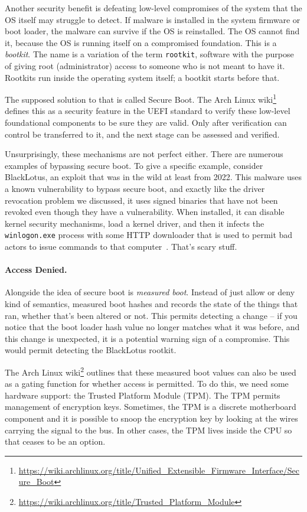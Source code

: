 Another security benefit is defeating low-level compromises of the system that the OS itself may struggle to detect. If malware is installed in the system firmware or boot loader, the malware can survive if the OS is reinstalled. The OS cannot find it, because the OS is running itself on a compromised foundation. This is a \textit{bootkit}. The name is a variation of the term \texttt{rootkit}, software with the purpose of giving root (administrator) access to someone who is not meant to have it. Rootkits run inside the operating system itself; a bootkit starts before that. 

The supposed solution to that is called Secure Boot. The Arch Linux wiki\footnote{ \url{https://wiki.archlinux.org/title/Unified_Extensible_Firmware_Interface/Secure_Boot}} defines this as a security feature in the UEFI standard to verify these low-level foundational components to be sure they are valid. Only after verification can control be transferred to it, and the next stage can be assessed and verified.

Unsurprisingly, these mechanisms are not perfect either. There are numerous examples of bypassing secure boot. To give a specific example, consider BlackLotus, an exploit that was in the wild at least from 2022. This malware uses a known vulnerability to bypass secure boot, and exactly like the driver revocation problem we discussed, it uses signed binaries that have not been revoked even though they have a vulnerability. When installed, it can disable kernel security mechanisms, load a kernel driver, and then it infects the \texttt{winlogon.exe} process with some HTTP downloader that is used to permit bad actors to issue commands to that computer~\cite{blacklotus}. That's scary stuff.

\paragraph{Access Denied.}
Alongside the idea of secure boot is \textit{measured boot}. Instead of just allow or deny kind of semantics, measured boot hashes and records the state of the things that ran, whether that's been altered or not. This permits detecting a change -- if you notice that the boot loader hash value no longer matches what it was before, and this change is unexpected, it is a potential warning sign of a compromise. This would permit detecting the BlackLotus rootkit.

The Arch Linux wiki\footnote{\url{https://wiki.archlinux.org/title/Trusted\_Platform\_Module}} outlines that these measured boot values can also be used as a gating function for whether access is permitted. To do this, we need some hardware support: the Trusted Platform Module (TPM). The TPM permits management of encryption keys. Sometimes, the TPM is a discrete motherboard component and it is possible to snoop the encryption key by looking at the wires carrying the signal to the bus. In other cases, the TPM lives inside the CPU so that ceases to be an option. 

